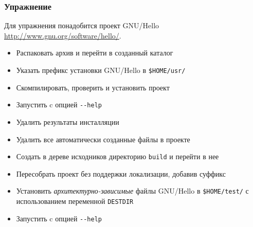 \begin{frame}
 \frametitle{Упражнение}
 Для упражнения понадобится проект GNU/Hello \url{http://www.gnu.org/software/hello/}.

  \begin{itemize}
    \item Распаковать архив и перейти в созданный каталог
    \item Указать префикс установки GNU/Hello в \texttt{\$HOME/usr/}
	\item Скомпилировать, проверить и установить проект
	\item Запустить c опцией {\tt -{}-help}
    \item Удалить результаты инсталляции
	\item Удалить все автоматически созданные файлы в проекте
	\item Создать в дереве исходников директорию {\tt build} и перейти в нее
	\item Пересобрать проект без поддержки локализации, добавив суффикс
	\item Установить {\it архитектурно-зависимые} файлы GNU/Hello 
		в \texttt{\$HOME/test/} с использованием переменной {\tt DESTDIR}
	\item Запустить c опцией {\tt -{}-help}
  \end{itemize}
\end{frame}

